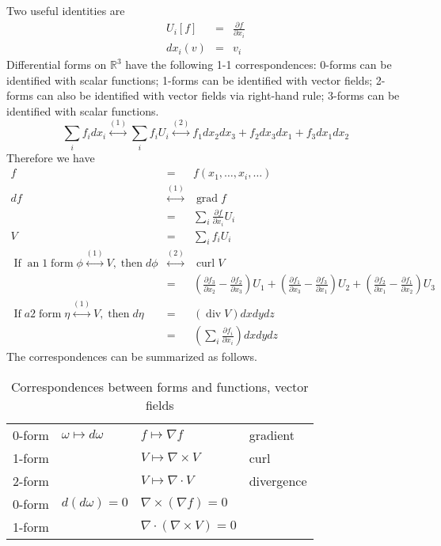 \documentclass{article}
\newcommand{\tmop}[1]{\ensuremath{\operatorname{#1}}}
\begin{document}
Two useful identities are
\begin{eqnarray}
  U_i [f] & = & \frac{\partial f}{\partial x_i} \\
  d x_i (v) & = & v_i 
\end{eqnarray}
Differential forms on $\mathbb{R}^3$ have the following 1-1 correspondences:
0-forms can be identified with scalar functions; 1-forms can be identified
with vector fields; 2-forms can also be identified with vector fields via
right-hand rule; 3-forms can be identified with scalar functions.
\[ \sum_i f_i d x_i \overset{(1)}{\longleftrightarrow} \sum_i f_i U_i
   \overset{(2)}{\longleftrightarrow} f_1 d x_2 d x_3 + f_2 d x_3 d x_1 + f_3
   d x_1 d x_2 \]
Therefore we have
\begin{eqnarray}
  f & = & f (x_1, \ldots, x_i, \ldots) \nonumber\\
  d f & \overset{(1)}{\longleftrightarrow} & \tmop{grad} f \\
  & = & \sum_i \frac{\partial f}{\partial x_i} U_i \nonumber\\
  V & = & \sum_i f_i U_i \nonumber\\
  \tmop{If} \tmop{an} 1 \tmop{form} \phi \overset{(1)}{\longleftrightarrow} V,
  \tmop{then} d \phi & \overset{(2)}{\longleftrightarrow} & \tmop{curl} V
  \nonumber\\
  & = & \left( \frac{\partial f_3}{\partial x_2} - \frac{\partial
  f_2}{\partial x_3} \right) U_1 + \left( \frac{\partial f_1}{\partial x_3} -
  \frac{\partial f_3}{\partial x_1} \right) U_2 + \left( \frac{\partial
  f_2}{\partial x_1} - \frac{\partial f_1}{\partial x_2} \right) U_3 \\
  \tmop{If} a 2 \tmop{form} \eta \overset{(1)}{\longleftrightarrow} V,
  \tmop{then} d \eta & = & (\tmop{div} V) d x d y d z \nonumber\\
  & = & \left( \sum_i \frac{\partial f_i}{\partial x_i} \right) d x d y d z 
\end{eqnarray}
The correspondences can be summarized as follows.

\begin{table}[h]
  \begin{tabular}{llll}
    0-form & $\omega \mapsto d \omega$ & $f \mapsto \nabla f$ & gradient\\
    1-form &  & $V \mapsto \nabla \times V$ & curl\\
    2-form &  & $V \mapsto \nabla \cdot V$ & divergence\\
    0-form & $d (d \omega) = 0$ & $\nabla \times (\nabla f) = 0$ & \\
    1-form &  & $\nabla \cdot (\nabla \times V) = 0$ & 
  \end{tabular}
  \caption{Correspondences between forms and functions, vector fields }
\end{table}
\end{document}
